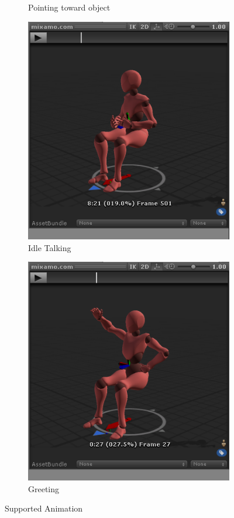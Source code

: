 \documentclass[18pt]{article}
\numberwithin{equation}{section} %
\numberwithin{figure}{section} %
\numberwithin{table}{section} %
\begin{document}
\begin{figure}[H]
\begin{subfigure}{0.2\textwidth}
					\caption{Pointing toward object}
				\end{subfigure}		
				\begin{subfigure}{0.2\textwidth}
					\centering
					\includegraphics[width=0.96\linewidth]{images/sit_talk}
					\caption{Idle Talking}
				\end{subfigure}
				\begin{subfigure}{0.2\textwidth}
					\centering
					\includegraphics[width=0.96\linewidth]{images/sit_wave}
					\caption{Greeting}
				\end{subfigure}				
				\caption{Supported Animation}
				\label{fig:animat}
			\end{figure}
	
\end{document}
